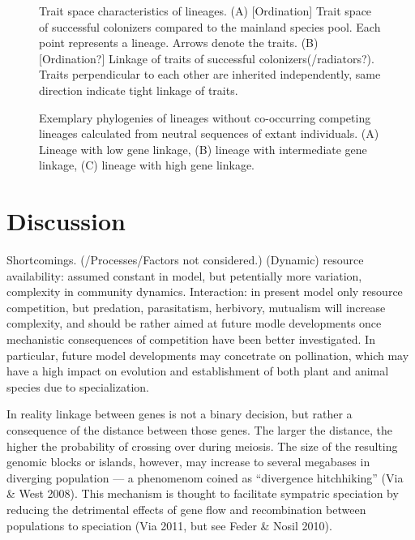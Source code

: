 \documentclass[a4paper]{scrartcl}
\begin{document}
\begin{figure}
  \caption{Trait space characteristics of lineages.
    (A) [Ordination] Trait space of successful colonizers compared to the mainland species pool. Each point represents a lineage.
    Arrows denote the traits.
    (B) [Ordination?] Linkage of traits of successful colonizers(/radiators?). Traits perpendicular to each other are inherited independently,
  same direction indicate tight linkage of traits.}
  \label{traitspace}
\end{figure}

\begin{figure}
  \caption{Exemplary phylogenies of lineages without co-occurring competing lineages calculated from neutral sequences of
    extant individuals.
    (A) Lineage with low gene linkage,
    (B) lineage with intermediate gene linkage,
    (C) lineage with high gene linkage.}
  \label{phylogenies}
\end{figure}

\section{Discussion}


Shortcomings. (/Processes/Factors not considered.)
(Dynamic) resource availability: assumed constant in model, but petentially more variation, complexity in community dynamics.
Interaction: in present model only resource competition, %
but predation, parasitatism, herbivory, mutualism will increase complexity,
and should be rather aimed at future modle developments once mechanistic consequences of competition have been better investigated.
In particular, future model developments may concetrate on pollination,
which may have a high impact on evolution and establishment of both plant and animal species due to specialization. %

In reality linkage between genes is not a binary decision, but rather a consequence of the distance between those genes.
The larger the distance, the higher the probability of crossing over during meiosis.
The size of the resulting genomic blocks or islands, however, may increase to several megabases in diverging population ---
a phenomenom coined as ``divergence hitchhiking'' (Via \& West 2008). %
This mechanism is thought to facilitate sympatric speciation by reducing the detrimental effects of gene flow and
recombination between populations to speciation (Via 2011, but see Feder \& Nosil 2010).
\end{document}
